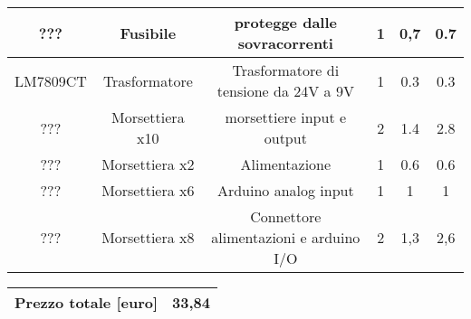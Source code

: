 \documentclass[12pt]{article}
\begin{document}
\begin{center}
\begin{tabular}{| c | c | c | c| c |c|}
        \hline
        \rowcolor{Apricot} ??? & Fusibile & protegge dalle sovracorrenti & 1 & 0,7 & 0.7\\
        \hline
        \rowcolor{Peach} LM7809CT & Trasformatore  & Trasformatore di tensione da 24V a 9V & 1 & 0.3 & 0.3\\
        \hline
        \rowcolor{Apricot} ??? & Morsettiera x10 & morsettiere input e output & 2 & 1.4 & 2.8\\
        \hline
        \rowcolor{Peach} ??? & Morsettiera x2 & Alimentazione & 1 & 0.6 & 0.6\\
        \hline
        \rowcolor{Apricot} ??? & Morsettiera x6 & Arduino analog input & 1 & 1 & 1\\
        \hline
        \rowcolor{Peach} ??? & Morsettiera x8 & Connettore alimentazioni e arduino I/O & 2 & 1,3 & 2,6\\
        \hline
   \end{tabular}
   \vskip 2mm
   \begin{tabular}[h]{|p{4cm}| p{3cm}|  }
       \hline
        \rowcolor{BurntOrange} Prezzo totale [euro] & \cellcolor{white} \hspace{1cm} 33,84\\ 
        \hline
   \end{tabular}
   \end{center}
\vfill
\vskip 4mm 
\end{document}
